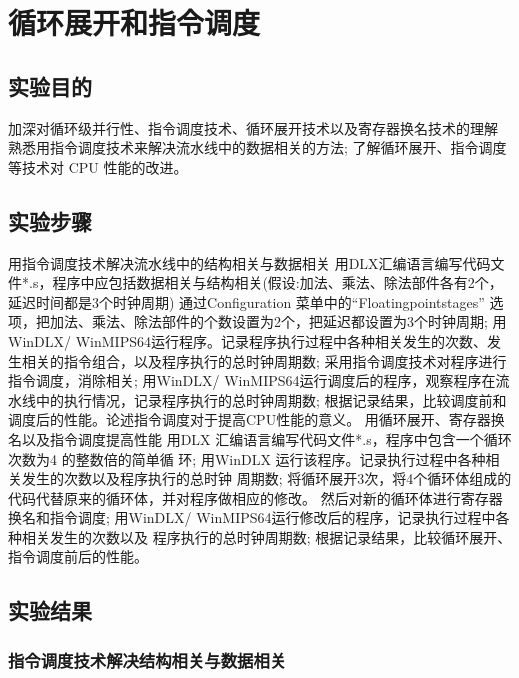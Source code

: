 \documentclass{ctexrep}
\begin{document}
\section{循环展开和指令调度}
\subsection{实验目的}
\begin{outline}[enumerate]
    \1 加深对循环级并行性、指令调度技术、循环展开技术以及寄存器换名技术的理解
    \1 熟悉用指令调度技术来解决流水线中的数据相关的方法;
    \1 了解循环展开、指令调度等技术对 CPU 性能的改进。
\end{outline}
\subsection{实验步骤}

\begin{outline}[enumerate]
    \1 用指令调度技术解决流水线中的结构相关与数据相关
        \2 用DLX汇编语言编写代码文件*.s，程序中应包括数据相关与结构相关(假设:加法、乘法、除法部件各有2个，延迟时间都是3个时钟周期)
        \2 通过Configuration 菜单中的“Floatingpointstages” 选项，把加法、乘法、除法部件的个数设置为2个，把延迟都设置为3个时钟周期;
        \2 用WinDLX/ WinMIPS64运行程序。记录程序执行过程中各种相关发生的次数、发生相关的指令组合，以及程序执行的总时钟周期数;
        \2 采用指令调度技术对程序进行指令调度，消除相关;
        \2 用WinDLX/ WinMIPS64运行调度后的程序，观察程序在流水线中的执行情况，记录程序执行的总时钟周期数;
        \2 根据记录结果，比较调度前和调度后的性能。论述指令调度对于提高CPU性能的意义。
    \1 用循环展开、寄存器换名以及指令调度提高性能
        \2 用DLX 汇编语言编写代码文件*.s，程序中包含一个循环次数为4 的整数倍的简单循 环;
        \2 用WinDLX 运行该程序。记录执行过程中各种相关发生的次数以及程序执行的总时钟 周期数;
        \2 将循环展开3次，将4个循环体组成的代码代替原来的循环体，并对程序做相应的修改。 然后对新的循环体进行寄存器换名和指令调度;
        \2 用WinDLX/ WinMIPS64运行修改后的程序，记录执行过程中各种相关发生的次数以及 程序执行的总时钟周期数;
        \2 根据记录结果，比较循环展开、指令调度前后的性能。
\end{outline}

\subsection{实验结果}
\subsubsection{指令调度技术解决结构相关与数据相关}
\end{document}

